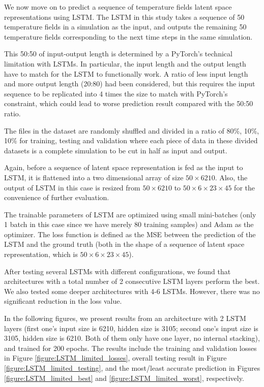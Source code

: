 We now move on to predict a sequence of temperature fields latent space representations using LSTM. The LSTM in this study takes a sequence of 50 temperature fields in a simulation as the input, and outputs the remaining 50 temperature fields corresponding to the next time steps in the same simulation.

This 50:50 of input-output length is determined by a PyTorch's technical limitation with LSTMs. In particular, the input length and the output length have to match for the LSTM to functionally work. A ratio of less input length and more output length (20:80) had been considered, but this requires the input sequence to be replicated into 4 times the size to match with PyTorch's constraint, which could lead to worse prediction result compared with the 50:50 ratio.

The files in the dataset are randomly shuffled and divided in a ratio of 80\%, 10\%, 10\% for training, testing and validation where each piece of data in these divided datasets is a complete simulation to be cut in half as input and output.

Again, before a sequence of latent space representation is fed as the input to LSTM, it is flattened into a two dimensional array of size $50 \times 6210$. Also, the output of LSTM in this case is resized from $50 \times 6210$ to $50 \times 6 \times 23 \times 45$ for the convenience of further evaluation.

The trainable parameters of LSTM are optimized using small mini-batches (only 1 batch in this case since we have merely 80 training samples) and Adam as the optimizer. The loss function is defined as the MSE between the prediction of the LSTM and the ground truth (both in the shape of a sequence of latent space representation, which is $50 \times 6 \times 23 \times 45$).

After testing several LSTMs with different configurations, we found that architectures with a total number of 2 consecutive LSTM layers perform the best. We also tested some deeper architectures with 4-6 LSTMs. However, there was no significant reduction in the loss value.

In the following figures, we present results from an architecture with 2 LSTM layers (first one's input size is 6210, hidden size is 3105; second one's input size is 3105, hidden size is 6210. Both of them only have one layer, no internal stacking), and trained for 200 epochs. The results include the training and validation losses in Figure \ref{figure:LSTM_limited_losses}, overall testing result in Figure \ref{figure:LSTM_limited_testing}, and the most/least accurate prediction in Figures \ref{figure:LSTM_limited_best} and \ref{figure:LSTM_limited_worst}, respectively.

